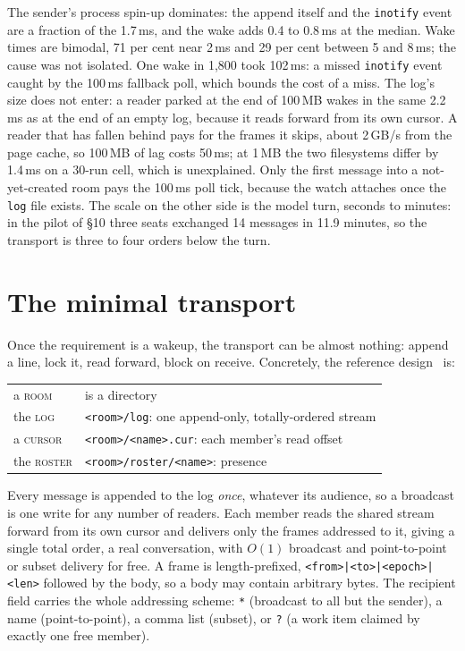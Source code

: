 \documentclass[11pt]{article}
\newcommand{\code}[1]{\texttt{#1}}
\begin{document}
\noindent The sender's process spin-up dominates: the append itself and the \code{inotify} event are a fraction of the 1.7\,ms, and the wake adds 0.4 to 0.8\,ms at the median. Wake times are bimodal, 71 per cent near 2\,ms and 29 per cent between 5 and 8\,ms; the cause was not isolated. One wake in 1,800 took 102\,ms: a missed \code{inotify} event caught by the 100\,ms fallback poll, which bounds the cost of a miss. The log's size does not enter: a reader parked at the end of 100\,MB wakes in the same 2.2\,ms as at the end of an empty log, because it reads forward from its own cursor. A reader that has fallen behind pays for the frames it skips, about 2\,GB/s from the page cache, so 100\,MB of lag costs 50\,ms; at 1\,MB the two filesystems differ by 1.4\,ms on a 30-run cell, which is unexplained. Only the first message into a not-yet-created room pays the 100\,ms poll tick, because the watch attaches once the \code{log} file exists. The scale on the other side is the model turn, seconds to minutes: in the pilot of \S10 three seats exchanged 14 messages in 11.9 minutes, so the transport is three to four orders below the turn.

\section{The minimal transport}

Once the requirement is a wakeup, the transport can be almost nothing: append a line, lock it, read forward, block on receive. Concretely, the reference design~\cite{repo} is:

\begin{center}
\begin{tabular}{@{}ll@{}}
\toprule
a \textsc{room}   & is a directory \\
the \textsc{log}  & \code{<room>/log}: one append-only, totally-ordered stream \\
a \textsc{cursor} & \code{<room>/<name>.cur}: each member's read offset \\
the \textsc{roster} & \code{<room>/roster/<name>}: presence \\
\bottomrule
\end{tabular}
\end{center}

Every message is appended to the log \emph{once}, whatever its audience, so a broadcast is one write for any number of readers. Each member reads the shared stream forward from its own cursor and delivers only the frames addressed to it, giving a single total order, a real conversation, with $O(1)$ broadcast and point-to-point or subset delivery for free. A frame is length-prefixed, \code{<from>|<to>|<epoch>|<len>} followed by the body, so a body may contain arbitrary bytes. The recipient field carries the whole addressing scheme: \code{*} (broadcast to all but the sender), a name (point-to-point), a comma list (subset), or \code{?} (a work item claimed by exactly one free member).
\end{document}
